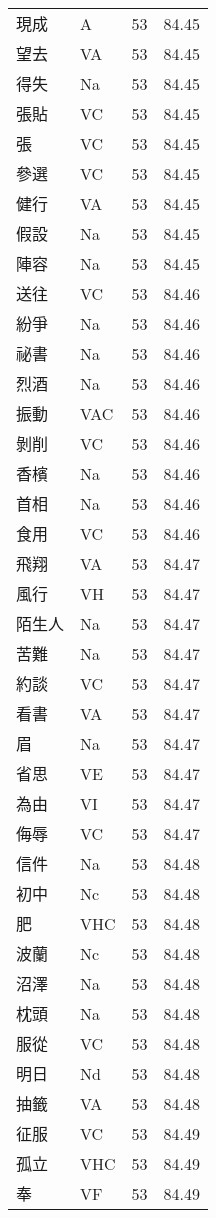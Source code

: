 \documentclass[twocolumn]{book}
\begin{document}
\begin{supertabular}{llrr}
現成 & A & 53 &  84.45\\
望去 & VA & 53 &  84.45\\
得失 & Na & 53 &  84.45\\
張貼 & VC & 53 &  84.45\\
張 & VC & 53 &  84.45\\
參選 & VC & 53 &  84.45\\
健行 & VA & 53 &  84.45\\
假設 & Na & 53 &  84.45\\
陣容 & Na & 53 &  84.45\\
送往 & VC & 53 &  84.46\\
紛爭 & Na & 53 &  84.46\\
祕書 & Na & 53 &  84.46\\
烈酒 & Na & 53 &  84.46\\
振動 & VAC & 53 &  84.46\\
剝削 & VC & 53 &  84.46\\
香檳 & Na & 53 &  84.46\\
首相 & Na & 53 &  84.46\\
食用 & VC & 53 &  84.46\\
飛翔 & VA & 53 &  84.47\\
風行 & VH & 53 &  84.47\\
陌生人 & Na & 53 &  84.47\\
苦難 & Na & 53 &  84.47\\
約談 & VC & 53 &  84.47\\
看書 & VA & 53 &  84.47\\
眉 & Na & 53 &  84.47\\
省思 & VE & 53 &  84.47\\
為由 & VI & 53 &  84.47\\
侮辱 & VC & 53 &  84.47\\
信件 & Na & 53 &  84.48\\
初中 & Nc & 53 &  84.48\\
肥 & VHC & 53 &  84.48\\
波蘭 & Nc & 53 &  84.48\\
沼澤 & Na & 53 &  84.48\\
枕頭 & Na & 53 &  84.48\\
服從 & VC & 53 &  84.48\\
明日 & Nd & 53 &  84.48\\
抽籤 & VA & 53 &  84.48\\
征服 & VC & 53 &  84.49\\
孤立 & VHC & 53 &  84.49\\
奉 & VF & 53 &  84.49\\

\end{supertabular}
\end{document}
